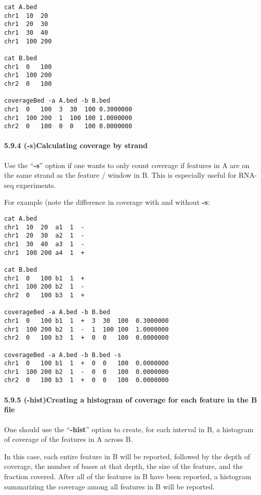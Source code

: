 \documentclass[letterpaper,10pt,english]{sphinxmanual}
\begin{document}
\begin{Verbatim}[commandchars=\\\{\}]
cat A.bed
chr1  10  20
chr1  20  30
chr1  30  40
chr1  100 200

cat B.bed
chr1  0   100
chr1  100 200
chr2  0   100

coverageBed -a A.bed -b B.bed
chr1  0   100  3  30  100 0.3000000
chr1  100 200  1  100 100 1.0000000
chr2  0   100  0  0   100 0.0000000
\end{Verbatim}


\paragraph{5.9.4 (-s)Calculating coverage by strand}
\label{content/coverageBed:s-calculating-coverage-by-strand}
Use the ``\textbf{-s}'' option if one wants to only count coverage if features in A are on the same strand as the
feature / window in B. This is especially useful for RNA-seq experiments.

For example (note the difference in coverage with and without \textbf{-s}:

\begin{Verbatim}[commandchars=\\\{\}]
cat A.bed
chr1  10  20  a1  1  -
chr1  20  30  a2  1  -
chr1  30  40  a3  1  -
chr1  100 200 a4  1  +

cat B.bed
chr1  0   100 b1  1  +
chr1  100 200 b2  1  -
chr2  0   100 b3  1  +

coverageBed -a A.bed -b B.bed
chr1  0   100 b1  1  +  3  30  100  0.3000000
chr1  100 200 b2  1  -  1  100 100  1.0000000
chr2  0   100 b3  1  +  0  0   100  0.0000000

coverageBed -a A.bed -b B.bed -s
chr1  0   100 b1  1  +  0  0   100  0.0000000
chr1  100 200 b2  1  -  0  0   100  0.0000000
chr2  0   100 b3  1  +  0  0   100  0.0000000
\end{Verbatim}


\paragraph{5.9.5 (-hist)Creating a histogram of coverage for each feature in the B file}
\label{content/coverageBed:hist-creating-a-histogram-of-coverage-for-each-feature-in-the-b-file}
One should use the ``\textbf{-hist}'' option to create, for each interval in B, a histogram of coverage of the
features in A across B.

In this case, each entire feature in B will be reported, followed by the depth of coverage, the number of
bases at that depth, the size of the feature, and the fraction covered. After all of the features in B have
been reported, a histogram summarizing the coverage among all features in B will be reported.
\end{document}
